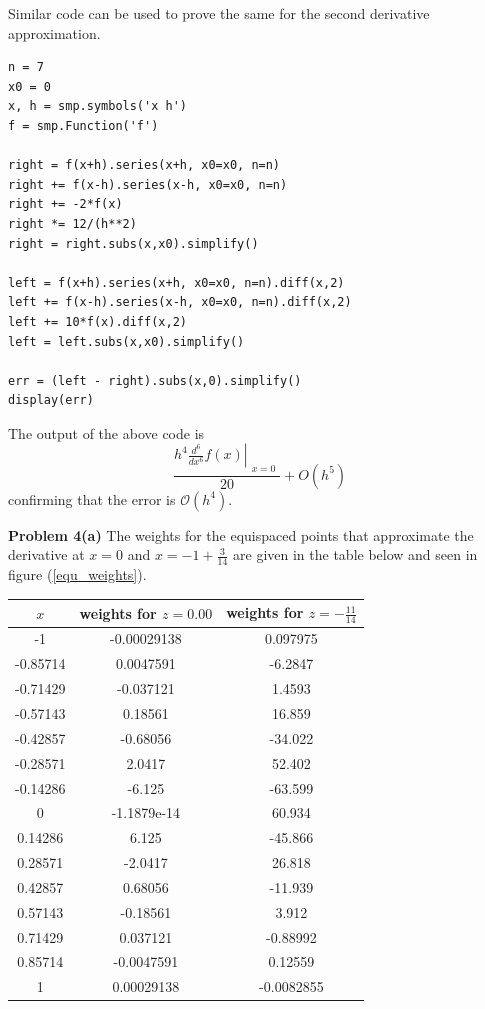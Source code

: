 \documentclass[12pt]{article}
\newcommand{\problem}[1]{\hspace{-4 ex} \large \textbf{Problem #1} }
\begin{document}
Similar code can be used to prove the same for the second derivative approximation.
\begin{lstlisting}
n = 7
x0 = 0
x, h = smp.symbols('x h')
f = smp.Function('f')

right = f(x+h).series(x+h, x0=x0, n=n)
right += f(x-h).series(x-h, x0=x0, n=n)
right += -2*f(x)
right *= 12/(h**2)
right = right.subs(x,x0).simplify()

left = f(x+h).series(x+h, x0=x0, n=n).diff(x,2) 
left += f(x-h).series(x-h, x0=x0, n=n).diff(x,2)
left += 10*f(x).diff(x,2)
left = left.subs(x,x0).simplify()

err = (left - right).subs(x,0).simplify()
display(err)
\end{lstlisting}
The output of the above code is
$$
\frac{h^{4} \left. \frac{d^{6}}{d x^{6}} f{\left (x \right )} \right|_{\substack{ x=0 }}}{20} + O\left(h^{5}\right)
$$
confirming that the error is $\mathcal{O}(h^4)$.
\bigbreak

\problem{4(a)} The weights for the equispaced points that approximate the derivative at $x=0$ and $x=-1+\tfrac{3}{14}$ are given in the table below and seen in figure (\ref{equ_weights}). 
\begin{center}
	\begin{tabular}{|c|c|c|}
		\hline
		$x$&weights for $z=0.00$&weights for $z=-\tfrac{11}{14}$\\ \hline
		-1&-0.00029138&0.097975\\ \hline
		-0.85714&0.0047591&-6.2847\\ \hline
		-0.71429&-0.037121&1.4593\\ \hline
		-0.57143&0.18561&16.859\\ \hline
		-0.42857&-0.68056&-34.022\\ \hline
		-0.28571&2.0417&52.402\\ \hline
		-0.14286&-6.125&-63.599\\ \hline
		0&-1.1879e-14&60.934\\ \hline
		0.14286&6.125&-45.866\\ \hline
		0.28571&-2.0417&26.818\\ \hline
		0.42857&0.68056&-11.939\\ \hline
		0.57143&-0.18561&3.912\\ \hline
		0.71429&0.037121&-0.88992\\ \hline
		0.85714&-0.0047591&0.12559\\ \hline
		1&0.00029138&-0.0082855\\ \hline
	\end{tabular}
\end{center}
\end{document}
